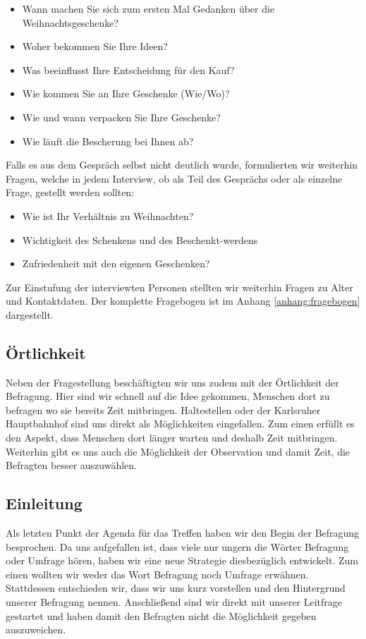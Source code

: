 \documentclass[12pt,ngerman, fleqn]{book} %
\begin{document}
\begin{itemize}
    \item Wann machen Sie sich zum ersten Mal Gedanken über die Weihnachtsgeschenke?
    \item Woher bekommen Sie Ihre Ideen?
    \item Was beeinflusst Ihre Entscheidung für den Kauf?
    \item Wie kommen Sie an Ihre Geschenke (Wie/Wo)?
    \item Wie und wann verpacken Sie Ihre Geschenke?
    \item Wie läuft die Bescherung bei Ihnen ab?
\end{itemize}

Falls es aus dem Gespräch selbst nicht deutlich wurde, formulierten wir weiterhin Fragen, welche in jedem Interview, ob als Teil des Gesprächs oder als einzelne Frage, gestellt werden sollten:

\begin{itemize}
    \item Wie ist Ihr Verhältnis zu Weihnachten?
    \item Wichtigkeit des Schenkens und des Beschenkt-werdens
    \item Zufriedenheit mit den eigenen Geschenken?
\end{itemize}

Zur Einstufung der interviewten Personen stellten wir weiterhin Fragen zu Alter und Kontaktdaten. Der komplette Fragebogen ist im Anhang \ref{anhang:fragebogen} dargestellt.

\subsection{Örtlichkeit}
Neben der Fragestellung beschäftigten wir uns zudem mit der Örtlichkeit der Befragung. Hier sind wir schnell auf die Idee gekommen, Menschen dort zu befragen wo sie bereits Zeit mitbringen. Haltestellen oder der Karlsruher Hauptbahnhof sind uns direkt als Möglichkeiten eingefallen. Zum einen erfüllt es den Aspekt, dass Menschen dort länger warten und deshalb Zeit mitbringen. Weiterhin gibt es uns auch die Möglichkeit der Observation und damit Zeit, die Befragten besser auszuwählen.

\subsection{Einleitung}
Als letzten Punkt der Agenda für das Treffen haben wir den Begin der Befragung besprochen. Da uns aufgefallen ist, dass viele nur ungern die Wörter Befragung oder Umfrage hören, haben wir eine neue Strategie diesbezüglich entwickelt. Zum einen wollten wir weder das Wort Befragung noch Umfrage erwähnen. Stattdessen entschieden wir, dass wir uns kurz vorstellen und den Hintergrund unserer Befragung nennen. Anschließend sind wir direkt mit unserer Leitfrage gestartet und haben damit den Befragten nicht die Möglichkeit gegeben auszuweichen.
\end{document}
